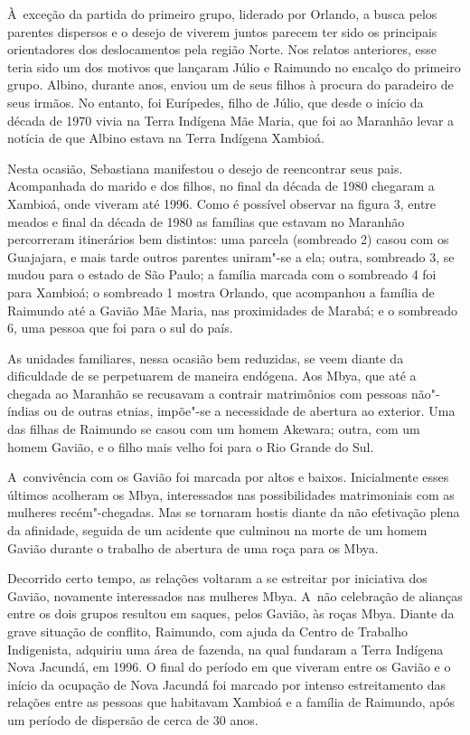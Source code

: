 À~exceção da partida do primeiro grupo, liderado por Orlando, a busca
pelos parentes dispersos e o desejo de viverem juntos parecem ter sido
os principais orientadores dos deslocamentos pela região Norte. Nos
relatos anteriores, esse teria sido um dos motivos que lançaram Júlio e
Raimundo no encalço do primeiro grupo. Albino, durante anos, enviou um
de seus filhos à procura do paradeiro de seus irmãos. No entanto, foi
Eurípedes, filho de Júlio, que desde o início da década de 1970 vivia na
Terra Indígena Mãe Maria, que foi ao Maranhão levar a notícia de que
Albino estava na Terra Indígena Xambioá.

Nesta ocasião, Sebastiana manifestou o desejo de reencontrar seus pais.
Acompanhada do marido e dos filhos, no final da década de 1980 chegaram
a Xambioá, onde viveram até 1996. Como é possível observar na figura 3,
entre meados e final da década de 1980 as famílias que estavam no
Maranhão percorreram itinerários bem distintos: uma parcela (sombreado
2) casou com os Guajajara, e mais tarde outros parentes uniram"-se a ela; 
outra, sombreado 3, se mudou para o estado de São Paulo; a
família marcada com o sombreado 4 foi para Xambioá; o sombreado 1
mostra Orlando, que acompanhou a família de Raimundo até a  Gavião
Mãe Maria, nas proximidades de Marabá; e o sombreado 6, uma pessoa que
foi para o sul do país.

As unidades familiares, nessa ocasião bem reduzidas, se veem diante da
dificuldade de se perpetuarem de maneira endógena. Aos Mbya, que até a
chegada ao Maranhão se recusavam a contrair matrimônios com pessoas
não"-índias ou de outras etnias, impõe"-se a necessidade de abertura ao
exterior. Uma das filhas de Raimundo se casou com um homem Akewara;
outra, com um homem Gavião, e o filho mais velho foi para o Rio Grande
do Sul. 

A~convivência com os Gavião foi marcada por altos e baixos. Inicialmente
esses últimos acolheram os Mbya, interessados nas possibilidades
matrimoniais com as mulheres recém"-chegadas. Mas se tornaram hostis
diante da não efetivação plena da afinidade, seguida de um acidente que
culminou na morte de um homem Gavião durante o trabalho de abertura de
uma roça para os Mbya.

Decorrido certo tempo, as relações voltaram a se estreitar por
iniciativa dos Gavião, novamente interessados nas mulheres Mbya. A~não
celebração de alianças entre os dois grupos resultou em saques, pelos
Gavião, às roças Mbya. Diante da grave situação de conflito, Raimundo,
com ajuda da  Centro de Trabalho Indigenista, adquiriu uma área de
fazenda, na qual fundaram a Terra Indígena Nova Jacundá, em 1996. O
final do período em que viveram entre os Gavião e o início da ocupação
de Nova Jacundá foi marcado por intenso estreitamento das relações
entre as pessoas que habitavam Xambioá e a família de Raimundo, após um
período de dispersão de cerca de 30 anos.

